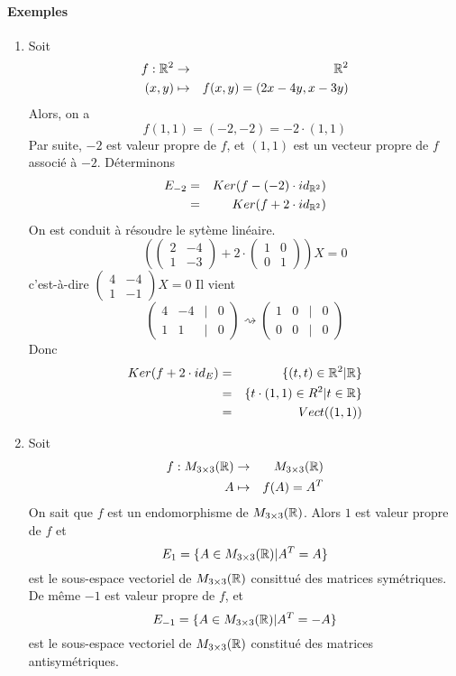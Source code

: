\paragraph{Exemples}
\begin{enumerate}
  \item Soit 
    \begin{eqnarray*}
      f: \mathbb{R}^2 &\rightarrow& \mathbb{R}^2 \\
      (x, y) &\mapsto& f(x, y) = (2x - 4 y, x -3 y)
    \end{eqnarray*}
    Alors, on a 
    $$f(1, 1) = (-2, -2) = -2 \cdot (1, 1)$$
    Par suite, $-2$ est valeur propre de $f$, et $(1, 1)$ est un vecteur propre de $f$ associé à $-2$. Déterminons 
    \begin{eqnarray*}
      E_{-2} &=& Ker(f-(-2)\cdot id_{\mathbb{R}^2} ) \\
        &=& Ker(f + 2 \cdot id_{\mathbb{R}^2})
    \end{eqnarray*}
    On est conduit à résoudre le sytème linéaire.
    $$\left(\begin{pmatrix}
        2 & -4 \\
        1 & -3
      \end{pmatrix} + 2 \cdot
      \begin{pmatrix}
        1 & 0 \\
        0 & 1
      \end{pmatrix} \right) X = 0$$
    c'est-à-dire $\begin{pmatrix} 4 & -4 \\ 1 & -1 \end{pmatrix} X = 0$ Il vient
    $$\begin{pmatrix} 4 & -4 & \vert & 0 \\ 1 & 1 & \vert & 0 \end{pmatrix} \rightsquigarrow \begin{pmatrix} 1 & 0 & \vert & 0 \\ 0 & 0 & \vert & 0 \end{pmatrix}$$
    Donc 
    \begin{eqnarray*}
      Ker(f + 2 \cdot id_E) &=& \{(t, t) \in \mathbb{R}^2 \vert \mathbb{R} \} \\
        &=& \{t \cdot (1, 1) \in R^2 \vert t \in \mathbb{R} \} \\
        &=& Vect((1, 1))
    \end{eqnarray*}
    
  \item Soit 
    \begin{eqnarray*}
      f: M_{3 \times 3}(\mathbb{R}) &\rightarrow& M_{3 \times 3}(\mathbb{R}) \\
      A &\mapsto& f(A) = A^{T}
    \end{eqnarray*}
    On sait que $f$ est un endomorphisme de $M_{3 \times 3}(\mathbb{R})$. Alors $1$ est valeur propre de $f$ et
    $$E_{1} = \{A \in M_{3 \times 3}(\mathbb{R}) \vert A^{T} = A \}$$
    est le sous-espace vectoriel de $M_{3 \times 3}(\mathbb{R})$ consittué des matrices symétriques. \\
    De même $-1$ est valeur propre de $f$, et
    $$E_{-1} = \{A \in M_{3\times 3}(\mathbb{R}) \vert A^{T} = -A\}$$
    est le sous-espace vectoriel de $M_{3\times 3}(\mathbb{R})$ constitué des matrices antisymétriques.
    

\end{enumerate}
